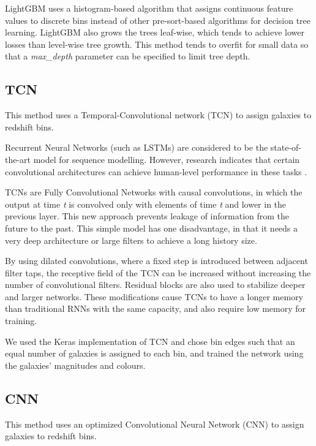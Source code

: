 \documentclass[twocolumn,twocolappendix]{aastex63}
\begin{document}
LightGBM uses a histogram-based algorithm that assigns continuous feature values to discrete bins
instead of other pre-sort-based algorithms for decision tree learning. LightGBM also grows the trees
leaf-wise, which tends to achieve lower losses than level-wise tree growth. This method tends to
overfit for small data so that a \textit{max\_depth} parameter can be specified to limit tree depth.

 
 
\subsection{ {\sc TCN}}
This method uses a Temporal-Convolutional network (TCN) \citep{baitcn} to assign galaxies to redshift
bins.
 
Recurrent Neural Networks (such as LSTMs) are considered to be the state-of-the-art model for
sequence modelling. However, research indicates that certain convolutional architectures can achieve
human-level performance in these tasks \citep{dauphin}.
 
TCNs are Fully Convolutional Networks with causal convolutions, in which the output at time
\textit{t} is convolved only with elements of time \textit{t} and lower in the previous layer. This
new approach prevents leakage of information from the future to the past. This simple model has one
disadvantage, in that it needs a very deep architecture or large filters to achieve a long history
size. 
 
By using dilated convolutions, where a fixed step is introduced between adjacent filter taps, the
receptive field of the TCN can be increased without increasing the number of convolutional filters.
Residual blocks \citep{resnet} are also used to stabilize deeper and larger networks. These
modifications cause TCNs to have a longer memory than traditional RNNs with the same capacity,  and
also require low memory for training.
 
We used the Keras implementation of TCN \citep{kerastcn} and chose bin edges such that an equal
number of galaxies is assigned to each bin, and trained the network using the galaxies' magnitudes
and colours. 

\subsection{ {\sc CNN} } \label{sec:cnn}
This method uses an optimized Convolutional Neural Network (CNN) to assign
galaxies to redshift bins. 
 
\end{document}
